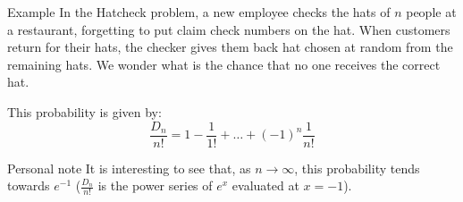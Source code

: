 \documentclass[a4paper]{article}
\begin{document}
\begin{parag}{Example}
    In the Hatcheck problem, a new employee checks the hats of $n$ people at a restaurant, forgetting to put claim check numbers on the hat. When customers return for their hats, the checker gives them back hat chosen at random from the remaining hats. We wonder what is the chance that no one receives the correct hat.

    This probability is given by:
    \[\frac{D_n}{n!} = 1 - \frac{1}{1!} + \ldots + \left(-1\right)^n \frac{1}{n!}\]

    \begin{subparag}{Personal note}
        It is interesting to see that, as $n \to \infty$, this probability tends towards $e^{-1}$ ($\frac{D_n}{n!}$ is the power series of $e^x$ evaluated at $x = -1$).
    \end{subparag}

\end{parag}
\end{document}
